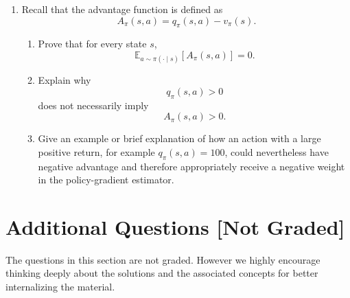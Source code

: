 \documentclass[12pt]{article}
\begin{document}
\begin{enumerate}[
    leftmargin=2.8cm,
    labelwidth=2.3cm,
    labelsep=0.5cm,
    align=left
]
  \item[\textbf{5. (4 pts)}] Recall that the advantage function is defined as
  \[
    A_\pi(s,a) = q_\pi(s,a) - v_\pi(s).
  \]

  \begin{enumerate}[label=(\alph*), leftmargin=2em]
    \item Prove that for every state $s$,
    \[
      \mathbb{E}_{a \sim \pi(\cdot \mid s)}
      \left[A_\pi(s,a)\right] = 0.
    \]

    \item Explain why
    \[
      q_\pi(s,a) > 0
    \]
    does not necessarily imply
    \[
      A_\pi(s,a) > 0.
    \]

    \item Give an example or brief explanation of how an action with a large
    positive return, for example $q_\pi(s,a)=100$, could nevertheless have
    negative advantage and therefore appropriately receive a negative weight
    in the policy-gradient estimator.
  \end{enumerate}


\end{enumerate}

\newpage

\section*{Additional Questions [Not Graded]}

The questions in this section are not graded. However we highly encourage thinking deeply about the solutions and the associated concepts for better internalizing the material.
\end{document}
